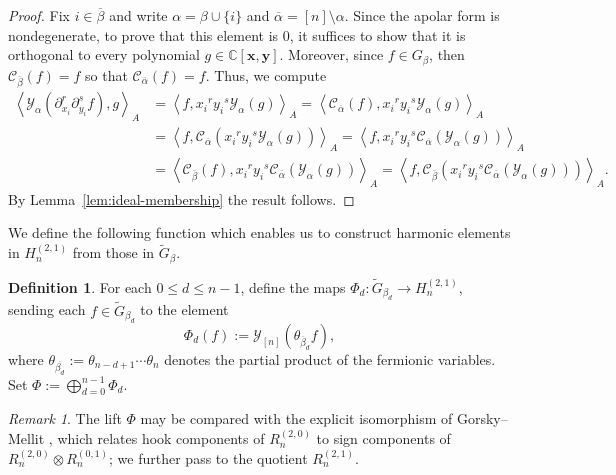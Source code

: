 \documentclass[11pt, noadjust, reqno]{amsart}
\theoremstyle{definition}
\newtheorem{definition}[theorem]{Definition}
\theoremstyle{remark}
\newtheorem{remark}[theorem]{Remark}
\numberwithin{equation}{section}
\newcommand{\0}{\emptyset}
\newcommand{\C}{\mathbb{C}}
\newcommand{\cC}{\mathcal{C}}
\newcommand{\cY}{\mathcal{Y}}
\begin{document}
\begin{proof}
Fix $i \in \overline{\beta}$ and write $\alpha = \beta \cup \{i\}$ and $\overline{\alpha}= [n] \setminus \alpha$.
Since the apolar form is nondegenerate, to prove that this element is $0$, it suffices to show that it is orthogonal to every polynomial $g \in \C[\bm{x},\bm{y}]$. Moreover, since $f \in G_\beta$, then $\cC_{\overline{\beta}}(f) = f$ so that $\cC_{\overline{\alpha}}(f) = f$. Thus, we compute 
\begin{align*}
\left\langle \cY_\alpha(\partial_{x_i}^r \partial_{y_i}^s f), g\right\rangle_A 
&= \left\langle  f, {x_i}^r{y_i}^s\cY_\alpha(g)\right\rangle_A 
= \left\langle  \cC_{\overline{\alpha}}(f), {x_i}^r{y_i}^s\cY_\alpha(g)\right\rangle_A\\
&= \left\langle  f, \cC_{\overline{\alpha}}({x_i}^r{y_i}^s\cY_\alpha(g))\right\rangle_A 
= \left\langle  f, {x_i}^r{y_i}^s \cC_{\overline{\alpha}}(\cY_\alpha(g))\right\rangle_A\\
&= \left\langle \cC_{\overline{\beta}}(f), {x_i}^r{y_i}^s \cC_{\overline{\alpha}}(\cY_\alpha(g))\right\rangle_A
= \left\langle f,  \cC_{\overline{\beta}}({x_i}^r{y_i}^s \cC_{\overline{\alpha}}(\cY_\alpha(g)))\right\rangle_A.
\end{align*}
By Lemma~\ref{lem:ideal-membership} the result follows.
\end{proof}
  
We define the following function which enables us to construct harmonic elements in $H_n^{(2,1)}$ from those in $\widetilde{G}_\beta$.

\begin{definition}
For each $0\leq d \leq n-1$, define the maps $\Phi_d: \widetilde{G}_{\beta_d}\to H_n^{(2,1)}$, sending each $f \in  \widetilde{G}_{\beta_d}$ to the element
\begin{equation*}
    \Phi_d(f) := \cY_{[n]}(\theta_{\overline{\beta}_d} f),
\end{equation*}
where $\theta_{\overline{\beta_d}} := \theta_{n-d+1} \cdots \theta_n$ denotes the partial product of the fermionic variables. Set $\Phi := \bigoplus_{d=0}^{n-1} \Phi_d$.
\end{definition}

\begin{remark}The lift $\Phi$ may be compared with the explicit isomorphism of Gorsky--Mellit \cite{GorskyMellit}, which relates hook components of $R_n^{(2,0)}$ to sign components of $R_n^{(2,0)} \otimes R_n^{(0,1)}$; we further pass to the quotient $R_n^{(2,1)}$.
\end{remark} 
\end{document}
